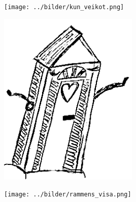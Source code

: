 %



\sclearpage

\sclearpage

\begin{intersong}
	\begin{center}
		\vspace{20mm}
		\texttt{[image: ../bilder/kun\_veikot.png]} 
	\end{center}
\end{intersong}
\sclearpage

\begin{intersong}
	\begin{center}
		\includegraphics[width=0.5\textwidth]{../bilder/fardigabilder/CamillasFardigaBilder/Nylandsnationshus3.png} 
	\end{center}
\end{intersong}
\sclearpage

\begin{intersong}
	\begin{center}
		\texttt{[image: ../bilder/rammens\_visa.png]} 
	\end{center}
\end{intersong}

\sclearpage



\sclearpage

